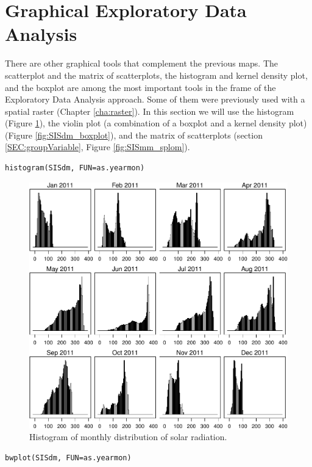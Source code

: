 \section{Graphical Exploratory Data Analysis}
\label{sec-3}

There are other graphical tools that complement the previous maps. The
scatterplot and the matrix of scatterplots, the histogram and kernel
density plot, and the boxplot are among the most important tools in
the frame of the Exploratory Data Analysis approach. Some of them were
previously used with a spatial raster (Chapter \ref{cha:raster}). In
this section we will use the histogram (Figure \ref{fig:SISdm_hist}),
the violin plot (a combination of a boxplot and a kernel density plot)
(Figure \ref{fig:SISdm_boxplot}), and the matrix of scatterplots
(section \ref{SEC:groupVariable}, Figure \ref{fig:SISmm_splom}).


\lstset{language=R,numbers=none}
\begin{lstlisting}
histogram(SISdm, FUN=as.yearmon)
\end{lstlisting}

\begin{figure}[htb]
\centering
\includegraphics[width=.9\linewidth]{figs/SISdm_histogram.pdf}
\caption{\label{fig:SISdm_hist}Histogram of monthly distribution of solar radiation.}
\end{figure}


\lstset{language=R,numbers=none}
\begin{lstlisting}
bwplot(SISdm, FUN=as.yearmon)
\end{lstlisting}

